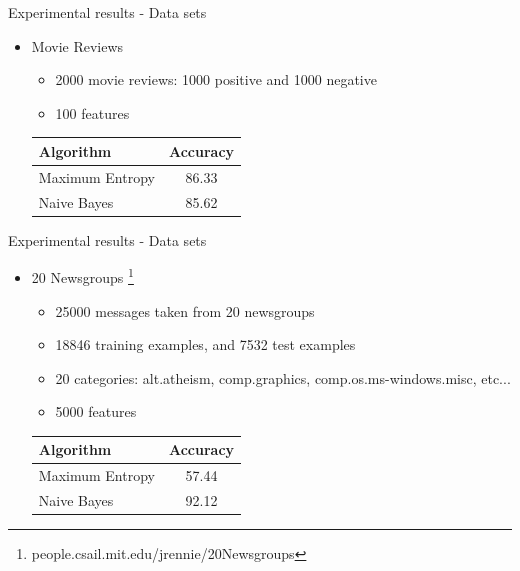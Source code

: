 \documentclass{beamer}
\begin{document}
\begin{frame}{Experimental results - Data sets}

\begin{itemize}
\item Movie Reviews\citep{Pang+Lee:04a}

\begin{itemize}
\item 2000 movie reviews: 1000 positive and 1000 negative
\item 100 features
\end{itemize}

\begin{table}[ht]
\centering
\begin{tabular}{ l c }
    \hline\hline
    Algorithm & Accuracy \\ [0.2ex]
    \hline
    Maximum Entropy &  86.33 \\ %
    Naive Bayes & 85.62 \\ %
    \hline
  \end{tabular}
\label{table:mrprecision}
\end{table}

\end{itemize}

\end{frame}


\begin{frame}{Experimental results - Data sets}

\begin{itemize}
\item 20 Newsgroups \footnote{people.csail.mit.edu/jrennie/20Newsgroups}

\begin{itemize}
\item 25000 messages taken from 20 newsgroups
\item 18846 training examples, and 7532 test examples
\item 20 categories: alt.atheism, comp.graphics, comp.os.ms-windows.misc, etc...
\item 5000 features
\end{itemize}

\begin{table}[ht]
\centering
\begin{tabular}{ l c }
    \hline\hline
    Algorithm & Accuracy \\ [0.2ex]
    \hline
    Maximum Entropy &  57.44 \\
    Naive Bayes & 92.12  \\
    \hline
  \end{tabular}
\label{table:20nprecision}
\end{table}

\end{itemize}

\end{frame}
\end{document}
